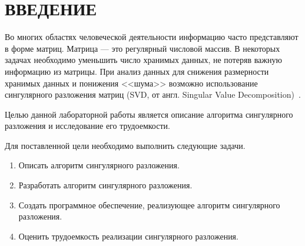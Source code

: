 \chapter*{\hfill{\centering  ВВЕДЕНИЕ}\hfill}


Во многих областях человеческой деятельности информацию часто представляют в форме матриц.
Матрица --- это регулярный числовой массив. В некоторых задачах необходимо уменьшить 
число хранимых данных, не потеряв важную информацию из матрицы.
При анализ данных для снижения размерности хранимых данных и понижения <<шума>> возможно использование сингулярного разложения матриц (SVD, от англ. Singular Value Decomposition)~\cite{SVD}.


Целью данной лабораторной работы является описание алгоритма сингулярного разложения и исследование его трудоемкости.

\label{sec:targets}
Для поставленной цели необходимо выполнить следующие задачи.
\begin{enumerate}
	\item Описать алгоритм сингулярного разложения.
	\item Разработать алгоритм сингулярного разложения.
	\item Создать программное обеспечение, реализующее алгоритм сингулярного разложения.
	\item Оценить трудоемкость реализации сингулярного разложения.
\end{enumerate}




